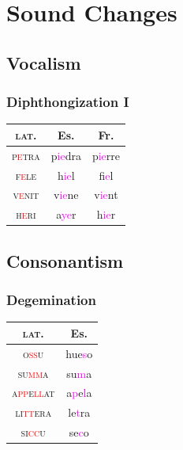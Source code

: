 \documentclass{report}[12pt]
\begin{document}
\section{Sound Changes}

\subsection{Vocalism}

\subsubsection{Diphthongization I}\label{sec:diphthongization_1}

\begin{tcolorbox}

\end{tcolorbox}

\begin{tabular}{c c c}
  \textsc{lat.} & Es. & Fr. \\
  \hline
  \textsc{p\textcolor{red}{e}tra} & p\textcolor{magenta}{ie}dra & p\textcolor{magenta}{ie}rre \\
  \textsc{f\textcolor{red}{e}le} & h\textcolor{magenta}{ie}l & f\textcolor{magenta}{ie}l \\
  \textsc{v\textcolor{red}{e}nit} & v\textcolor{magenta}{ie}ne & v\textcolor{magenta}{ie}nt \\
  \textsc{h\textcolor{red}{e}ri} & a\textcolor{magenta}{ye}r & h\textcolor{magenta}{ie}r \\
\end{tabular}

\subsection{Consonantism}

\subsubsection*{Degemination}

\begin{tcolorbox}
  
\end{tcolorbox}

\begin{tabular}{c c}
  \textsc{lat.} & Es. \\
  \hline
  \textsc{o\textcolor{red}{ss}u} & hue\textcolor{magenta}{s}o \\
  \textsc{su\textcolor{red}{mm}a} & su\textcolor{magenta}{m}a \\
  \textsc{a\textcolor{red}{pp}e\textcolor{red}{ll}at} & a\textcolor{magenta}{p}e\textcolor{magenta}{l}a \\
  \textsc{li\textcolor{red}{tt}era} & le\textcolor{magenta}{t}ra \\
  \textsc{si\textcolor{red}{cc}u} & se\textcolor{magenta}{c}o \\
\end{tabular}
\end{document}
